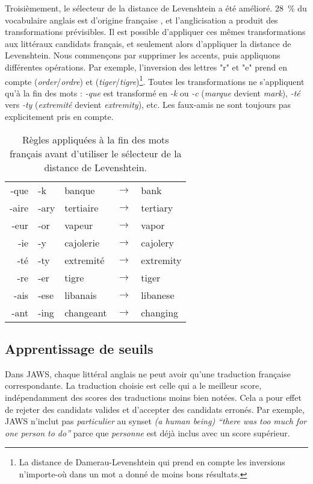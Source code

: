 Troisièmement, le sélecteur de la distance de Levenshtein a été amélioré. 28~\%
du vocabulaire anglais est d'origine française \citep{finkenstaedt1973ordered},
et l'anglicisation a produit des transformations prévisibles. Il est possible
d'appliquer ces mêmes transformations aux littéraux candidats français, et
seulement alors d'appliquer la distance de Levenshtein. Nous commençons par
supprimer les accents, puis appliquons différentes opérations. Par exemple,
l'inversion des lettres "r" et "e" prend en compte
(\textit{order}/\textit{ordre}) et (\textit{tiger}/\textit{tigre})\footnote{La
distance de Damerau-Levenshtein qui prend en compte les inversions n'importe-où
dans un mot \citep{damerau1964technique} a donné de moins bons résultats.}.
Toutes les transformations ne s'appliquent qu'à la fin des mots : \textit{-que}
est transformé en \textit{-k} ou \textit{-c} (\textit{marque} devient
\textit{mark}), \textit{-té} vers \textit{-ty} (\textit{extremité} devient
\textit{extremity}), etc. Les faux-amis ne sont toujours pas explicitement pris
en compte.

\begin{table}[ht]
\centering
\begin{tabular}{rllcl}
  \toprule
-que & -k & banque &$\to$& bank \\
-aire & -ary & tertiaire &$\to$& tertiary \\
-eur & -or & vapeur &$\to$& vapor \\
-ie & -y & cajolerie &$\to$& cajolery \\
-té & -ty & extremité &$\to$& extremity \\
-re & -er & tigre &$\to$& tiger \\
-ais & -ese & libanais &$\to$& libanese \\
-ant & -ing & changeant &$\to$& changing \\
  \bottomrule
\end{tabular}

\caption{\label{table:levenshteinrules}Règles appliquées à la fin des mots
français avant d'utiliser le sélecteur de la distance de Levenshtein.}

\end{table}


\subsection{Apprentissage de seuils}
\label{subsec:learning_thresholds}

Dans JAWS, chaque littéral anglais ne peut avoir qu'une traduction française
correspondante. La traduction choisie est celle qui a le meilleur score,
indépendamment des scores des traductions moins bien notées. Cela a pour effet
de rejeter des candidats valides et d'accepter des candidats erronés. Par
exemple, JAWS n'inclut pas \textit{particulier} au synset \textit{(a human
being) ``there was too much for one person to do''} parce que \textit{personne}
est déjà inclus avec un score supérieur.

